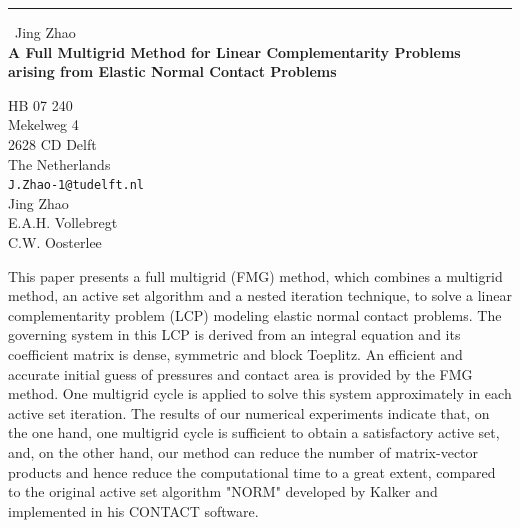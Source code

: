 \documentclass{report}
\begin{document}
\begin{center}
\rule{6in}{1pt} \
{\large Jing Zhao \\
{\bf A Full Multigrid Method for Linear Complementarity Problems arising from Elastic Normal Contact Problems}}

HB 07 240 \\ Mekelweg 4 \\ 2628 CD Delft \\ The Netherlands
\\
{\tt J.Zhao-1@tudelft.nl}\\
Jing Zhao\\
E.A.H. Vollebregt\\
C.W. Oosterlee\end{center}

This paper presents a full multigrid (FMG) method, which combines a
multigrid method, an active set algorithm and a nested iteration
technique, to solve a linear complementarity problem (LCP) modeling
elastic normal contact problems. The governing system in this LCP is
derived from an integral equation and its coefficient matrix is dense,
symmetric and block Toeplitz. An efficient and accurate initial guess of
pressures and contact area is provided by the FMG method. One multigrid
cycle is applied to solve this system approximately in each active set
iteration. The results of our numerical experiments indicate that, on the
one hand, one multigrid cycle is sufficient to obtain a satisfactory
active set, and, on the other hand, our method can reduce the number of
matrix-vector products and hence reduce the computational time to a great
extent, compared to the original active set algorithm "NORM" developed by
Kalker and implemented in his CONTACT software.
\end{document}

